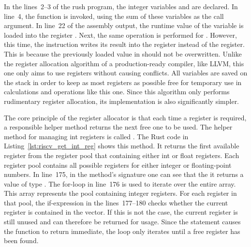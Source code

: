 \noindent
\begin{minipage}{.45\textwidth}
	\centering
\end{minipage}%
\hfill%
\begin{minipage}{.45\textwidth}
	\centering
	\vspace{.1cm}
\end{minipage}

In the lines~2--3 of the rush program, the integer variables  and  are declared.
In line~4, the  function is invoked, using the sum of these variables as the call argument.
In line~22 of the assembly output, the runtime value of the variable  is loaded into the register .
Next, the same operation is performed for  .
However, this time, the instruction writes its result into the  register instead of the  register.
This is because the previously loaded value in  should not be overwritten.
Unlike the register allocation algorithm of a production-ready compiler, like LLVM,
this one only aims to use registers without causing conflicts.
All variables are saved on the stack in order to keep as most registers as possible free for temporary use in calculations and operations like this one.
Since this algorithm only performs rudimentary register allocation, its implementation is also significantly simpler.

The core principle of the register allocator is that each time a register is required,
a responsible helper method returns the next free one to be used.
The helper method for managing int registers is called .
The Rust code in Listing~\ref{lst:riscv_get_int_reg} shows this method.%
%
%
%
It returns the first available register from the register pool that containing either int or float registers.
Each register pool contains all possible registers for either integer or floating-point numbers.
In line~175, in the method's signature one can see that the it returns a value of type .
The for-loop in line~176 is used to iterate over the entire  array.
This array represents the pool containing integer registers.
For each register in that pool, the if-expression in the lines~177--180 checks whether the current register  is contained in the  vector.
If this is not the case, the current register is still unused and can therefore be returned for usage.
Since the  statement causes the function to return immediate,
the loop only iterates until a free register has been found.

